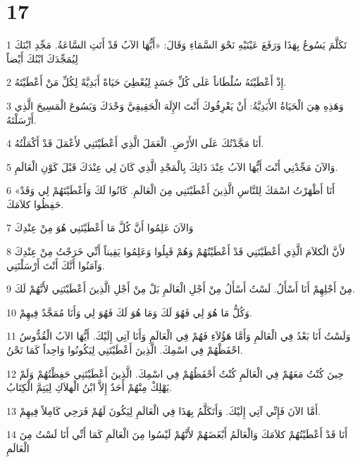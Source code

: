 \chapter{17}

\par 1 تَكَلَّمَ يَسُوعُ بِهَذَا وَرَفَعَ عَيْنَيْهِ نَحْوَ السَّمَاءِ وَقَالَ: «أَيُّهَا الآبُ قَدْ أَتَتِ السَّاعَةُ. مَجِّدِ ابْنَكَ لِيُمَجِّدَكَ ابْنُكَ أَيْضاً
\par 2 إِذْ أَعْطَيْتَهُ سُلْطَاناً عَلَى كُلِّ جَسَدٍ لِيُعْطِيَ حَيَاةً أَبَدِيَّةً لِكُلِّ مَنْ أَعْطَيْتَهُ.
\par 3 وَهَذِهِ هِيَ الْحَيَاةُ الأَبَدِيَّةُ: أَنْ يَعْرِفُوكَ أَنْتَ الإِلَهَ الْحَقِيقِيَّ وَحْدَكَ وَيَسُوعَ الْمَسِيحَ الَّذِي أَرْسَلْتَهُ.
\par 4 أَنَا مَجَّدْتُكَ عَلَى الأَرْضِ. الْعَمَلَ الَّذِي أَعْطَيْتَنِي لأَعْمَلَ قَدْ أَكْمَلْتُهُ.
\par 5 وَالآنَ مَجِّدْنِي أَنْتَ أَيُّهَا الآبُ عِنْدَ ذَاتِكَ بِالْمَجْدِ الَّذِي كَانَ لِي عِنْدَكَ قَبْلَ كَوْنِ الْعَالَمِ.
\par 6 «أَنَا أَظْهَرْتُ اسْمَكَ لِلنَّاسِ الَّذِينَ أَعْطَيْتَنِي مِنَ الْعَالَمِ. كَانُوا لَكَ وَأَعْطَيْتَهُمْ لِي وَقَدْ حَفِظُوا كلاَمَكَ.
\par 7 وَالآنَ عَلِمُوا أَنَّ كُلَّ مَا أَعْطَيْتَنِي هُوَ مِنْ عِنْدِكَ
\par 8 لأَنَّ الْكلاَمَ الَّذِي أَعْطَيْتَنِي قَدْ أَعْطَيْتُهُمْ وَهُمْ قَبِلُوا وَعَلِمُوا يَقِيناً أَنِّي خَرَجْتُ مِنْ عِنْدِكَ وَآمَنُوا أَنَّكَ أَنْتَ أَرْسَلْتَنِي.
\par 9 مِنْ أَجْلِهِمْ أَنَا أَسْأَلُ. لَسْتُ أَسْأَلُ مِنْ أَجْلِ الْعَالَمِ بَلْ مِنْ أَجْلِ الَّذِينَ أَعْطَيْتَنِي لأَنَّهُمْ لَكَ.
\par 10 وَكُلُّ مَا هُوَ لِي فَهُوَ لَكَ وَمَا هُوَ لَكَ فَهُوَ لِي وَأَنَا مُمَجَّدٌ فِيهِمْ.
\par 11 وَلَسْتُ أَنَا بَعْدُ فِي الْعَالَمِ وَأَمَّا هَؤُلاَءِ فَهُمْ فِي الْعَالَمِ وَأَنَا آتِي إِلَيْكَ. أَيُّهَا الآبُ الْقُدُّوسُ احْفَظْهُمْ فِي اسْمِكَ. الَّذِينَ أَعْطَيْتَنِي لِيَكُونُوا وَاحِداً كَمَا نَحْنُ.
\par 12 حِينَ كُنْتُ مَعَهُمْ فِي الْعَالَمِ كُنْتُ أَحْفَظُهُمْ فِي اسْمِكَ. الَّذِينَ أَعْطَيْتَنِي حَفِظْتُهُمْ وَلَمْ يَهْلِكْ مِنْهُمْ أَحَدٌ إِلاَّ ابْنُ الْهلاَكِ لِيَتِمَّ الْكِتَابُ.
\par 13 أَمَّا الآنَ فَإِنِّي آتِي إِلَيْكَ. وَأَتَكَلَّمُ بِهَذَا فِي الْعَالَمِ لِيَكُونَ لَهُمْ فَرَحِي كَامِلاً فِيهِمْ.
\par 14 أَنَا قَدْ أَعْطَيْتُهُمْ كلاَمَكَ وَالْعَالَمُ أَبْغَضَهُمْ لأَنَّهُمْ لَيْسُوا مِنَ الْعَالَمِ كَمَا أَنِّي أَنَا لَسْتُ مِنَ الْعَالَمِ
